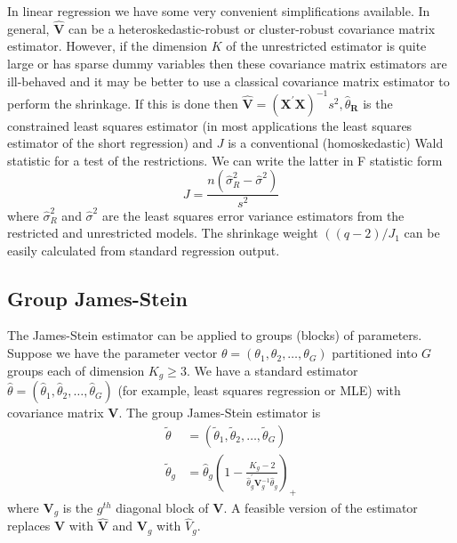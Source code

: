\documentclass[10pt]{article}
\begin{document}
In linear regression we have some very convenient simplifications available. In general, $\widehat{\boldsymbol{V}}$ can be a heteroskedastic-robust or cluster-robust covariance matrix estimator. However, if the dimension $K$ of the unrestricted estimator is quite large or has sparse dummy variables then these covariance matrix estimators are ill-behaved and it may be better to use a classical covariance matrix estimator to perform the shrinkage. If this is done then $\widehat{\boldsymbol{V}}=\left(\boldsymbol{X}^{\prime} \boldsymbol{X}\right)^{-1} s^{2}, \widehat{\theta}_{\boldsymbol{R}}$ is the constrained least squares estimator (in most applications the least squares estimator of the short regression) and $J$ is a conventional (homoskedastic) Wald statistic for a test of the restrictions. We can write the latter in F statistic form
$$
J=\frac{n\left(\widehat{\sigma}_{R}^{2}-\widehat{\sigma}^{2}\right)}{s^{2}}
$$
where $\widehat{\sigma}_{R}^{2}$ and $\widehat{\sigma}^{2}$ are the least squares error variance estimators from the restricted and unrestricted models. The shrinkage weight $\left((q-2) / J_{1}\right.$ can be easily calculated from standard regression output.

\subsection{Group James-Stein}
The James-Stein estimator can be applied to groups (blocks) of parameters. Suppose we have the parameter vector $\theta=\left(\theta_{1}, \theta_{2}, \ldots, \theta_{G}\right)$ partitioned into $G$ groups each of dimension $K_{g} \geq 3$. We have a standard estimator $\widehat{\theta}=\left(\widehat{\theta}_{1}, \widehat{\theta}_{2}, \ldots, \widehat{\theta}_{G}\right)$ (for example, least squares regression or MLE) with covariance matrix $\boldsymbol{V}$. The group James-Stein estimator is
$$
\begin{aligned}
\widetilde{\theta} &=\left(\widetilde{\theta}_{1}, \widetilde{\theta}_{2}, \ldots, \widetilde{\theta}_{G}\right) \\
\widetilde{\theta}_{g} &=\widehat{\theta}_{g}\left(1-\frac{K_{g}-2}{\hat{\theta}_{g}^{\prime} \boldsymbol{V}_{g}^{-1} \widehat{\theta}_{g}}\right)_{+}
\end{aligned}
$$
where $\boldsymbol{V}_{g}$ is the $g^{t h}$ diagonal block of $\boldsymbol{V}$. A feasible version of the estimator replaces $\boldsymbol{V}$ with $\widehat{\boldsymbol{V}}$ and $\boldsymbol{V}_{g}$ with $\widehat{V}_{g}$.
\end{document}
